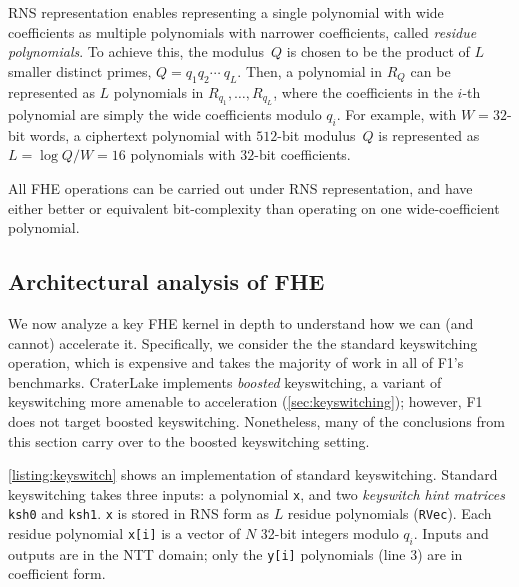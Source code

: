 RNS representation \cite{garner1959residue}  %
enables representing a single polynomial with wide coefficients as multiple polynomials with narrower coefficients,
called \emph{residue polynomials}.
To achieve this, the modulus~$Q$  is chosen to be the product of $L$
smaller distinct primes, $Q = q_1q_2\cdots\ q_L$.
Then, a polynomial in $R_Q$ can be represented as $L$ polynomials in
$R_{q_1}, \ldots, R_{q_L}$,
where the coefficients in the $i$-th polynomial are simply the wide coefficients modulo $q_i$.
%
For example, with $W = 32$-bit words, a ciphertext polynomial with $512$-bit modulus~$Q$ is represented as
$L = \log Q/W = 16$ polynomials with $32$-bit coefficients.

All FHE operations can be carried out under RNS representation, and have either better or equivalent bit-complexity than
  operating on one wide-coefficient polynomial.

\subsection{Architectural analysis of FHE}
\label{sec:fhe_analysis}

We now analyze a key FHE kernel in depth to understand how we can (and cannot) accelerate it.
Specifically, we consider the the standard keyswitching operation,
which is expensive and takes the majority of work in all of F1's benchmarks.
CraterLake implements \emph{boosted} keyswitching, a variant of keyswitching more amenable
to acceleration (\autoref{sec:keyswitching}); however, F1 does not target boosted keyswitching.
Nonetheless, many of the conclusions from this section carry over to the boosted keyswitching setting.

\autoref{listing:keyswitch} shows an implementation of standard keyswitching.
Standard keyswitching takes three inputs: a polynomial \texttt{x}, and two
\emph{keyswitch hint matrices} \texttt{ksh0} and \texttt{ksh1}. \texttt{x} is
stored in RNS form as $L$ residue polynomials (\texttt{RVec}). Each residue
polynomial \texttt{x[i]} is a vector of $N$ 32-bit integers modulo $q_i$.
Inputs and outputs are in the NTT domain; only the \texttt{y[i]} polynomials
(line 3) are in coefficient form.


